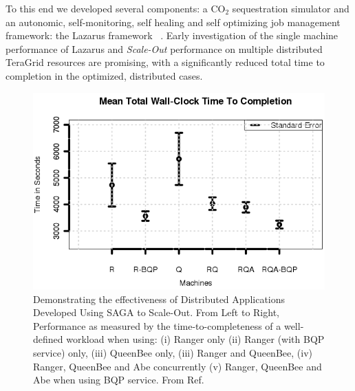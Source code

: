 \documentclass[a4paper,10pt]{article}
\begin{document}
To this end we developed several components: a CO$_2$ sequestration simulator and an autonomic, self-monitoring, self healing and self optimizing job management framework: the Lazarus framework ~\cite{gmac}. Early investigation of the single machine performance of Lazarus and {\it Scale-Out} performance on multiple distributed TeraGrid resources are promising, with a significantly reduced total time to completion in the optimized, distributed cases.

\begin{figure}
\begin{center}
\includegraphics[scale=0.8]{Figure7.png}
\end{center}
\caption{Demonstrating the effectiveness of Distributed Applications Developed  Using SAGA to Scale-Out. From Left to Right, Performance as measured by the time-to-completeness of a well-defined workload when using: (i) Ranger only (ii) Ranger (with BQP service) only, (iii) QueenBee only, (iii) Ranger and QueenBee, (iv) Ranger, QueenBee and Abe concurrently (v) Ranger, QueenBee 
  and Abe when using BQP service. From Ref.~\cite{gmac} }
\label{fig:results}
\end{figure}
\end{document}
